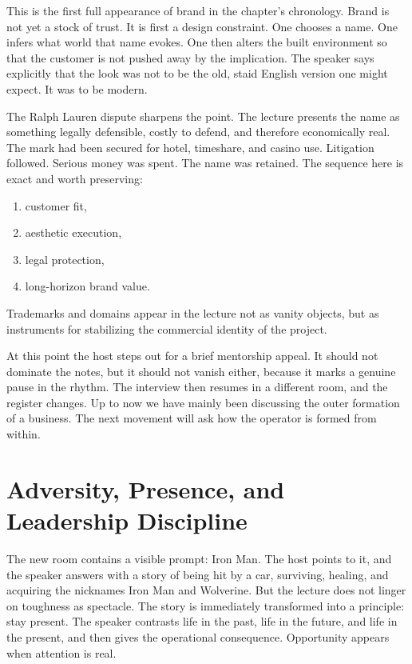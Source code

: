 This is the first full appearance of brand in the chapter's chronology. Brand is not yet a stock of trust. It is first a design constraint. One chooses a name. One infers what world that name evokes. One then alters the built environment so that the customer is not pushed away by the implication. The speaker says explicitly that the look was not to be the old, staid English version one might expect. It was to be modern.

The Ralph Lauren dispute sharpens the point. The lecture presents the name as something legally defensible, costly to defend, and therefore economically real. The mark had been secured for hotel, timeshare, and casino use. Litigation followed. Serious money was spent. The name was retained. The sequence here is exact and worth preserving:
\begin{enumerate}
\item customer fit,
\item aesthetic execution,
\item legal protection,
\item long-horizon brand value.
\end{enumerate}
Trademarks and domains appear in the lecture not as vanity objects, but as instruments for stabilizing the commercial identity of the project.

At this point the host steps out for a brief mentorship appeal. It should not dominate the notes, but it should not vanish either, because it marks a genuine pause in the rhythm. The interview then resumes in a different room, and the register changes. Up to now we have mainly been discussing the outer formation of a business. The next movement will ask how the operator is formed from within.

\section{Adversity, Presence, and Leadership Discipline}

The new room contains a visible prompt: Iron Man. The host points to it, and the speaker answers with a story of being hit by a car, surviving, healing, and acquiring the nicknames Iron Man and Wolverine. But the lecture does not linger on toughness as spectacle. The story is immediately transformed into a principle: stay present. The speaker contrasts life in the past, life in the future, and life in the present, and then gives the operational consequence. Opportunity appears when attention is real.

